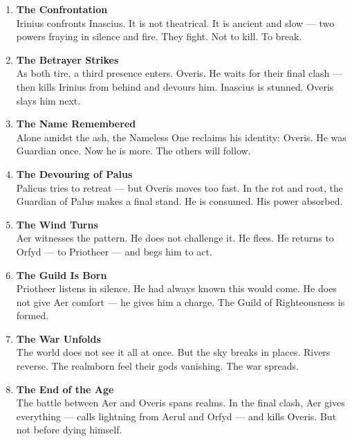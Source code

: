 \documentclass[9pt]{article}
\begin{document}
\begin{enumerate}
    \item \textbf{The Confrontation} \\
    Irinius confronts Inascius. It is not theatrical. It is ancient and slow — two powers fraying in silence and fire. They fight. Not to kill. To break.

    \vspace{1em}
    \item \textbf{The Betrayer Strikes} \\
    As both tire, a third presence enters. Overis. He waits for their final clash — then kills Irinius from behind and devours him. Inascius is stunned. Overis slays him next.

    \vspace{1em}
    \item \textbf{The Name Remembered} \\
    Alone amidst the ash, the Nameless One reclaims his identity: Overis. He was Guardian once. Now he is more. The others will follow.

    \vspace{1em}
    \item \textbf{The Devouring of Palus} \\
    Palicus tries to retreat — but Overis moves too fast. In the rot and root, the Guardian of Palus makes a final stand. He is consumed. His power absorbed.

    \vspace{1em}
    \item \textbf{The Wind Turns} \\
    Aer witnesses the pattern. He does not challenge it. He flees. He returns to Orfyd — to Priotheer — and begs him to act.

    \vspace{1em}
    \item \textbf{The Guild Is Born} \\
    Priotheer listens in silence. He had always known this would come. He does not give Aer comfort — he gives him a charge. The Guild of Righteousness is formed.

    \vspace{1em}
    \item \textbf{The War Unfolds} \\
    The world does not see it all at once. But the sky breaks in places. Rivers reverse. The realmborn feel their gods vanishing. The war spreads.

    \vspace{1em}
    \item \textbf{The End of the Age} \\
    The battle between Aer and Overis spans realms. In the final clash, Aer gives everything — calls lightning from Aerul and Orfyd — and kills Overis. But not before dying himself.

\end{enumerate}
\end{document}
